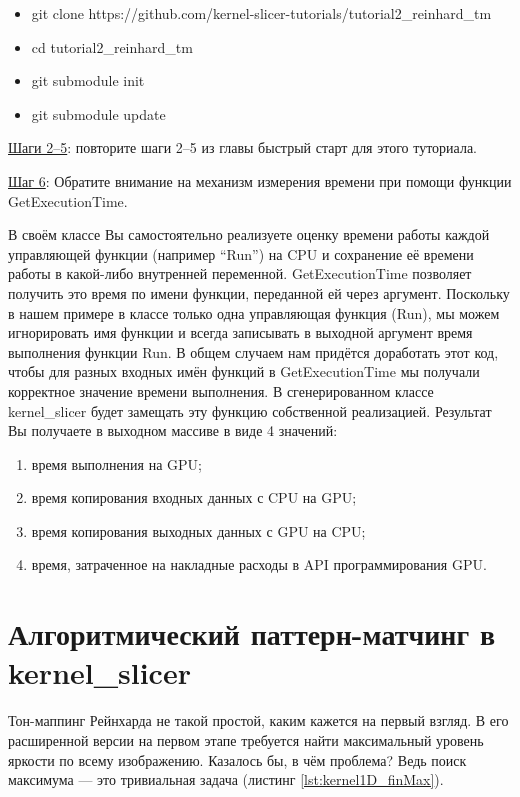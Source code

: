 \documentclass[11pt,fleqn,english,russian]{report} %
\begin{document}
\begin{itemize}
	\item git clone https://github.com/kernel-slicer-tutorials/tutorial2\_reinhard\_tm
	\item cd tutorial2\_reinhard\_tm
	\item git submodule init
	\item git submodule update
\end{itemize}

\vspace*{5px}
\noindent\underline{Шаги 2--5}: повторите шаги 2--5 из главы быстрый старт для этого туториала. 

\vspace*{5px}
\noindent\underline{Шаг 6}: Обратите внимание на механизм измерения времени при помощи функции GetExecutionTime. 

В своём классе Вы самостоятельно реализуете оценку времени работы каждой управляющей функции (например ``Run'') на CPU и сохранение её времени работы в какой-либо внутренней переменной. GetExecutionTime позволяет получить это время по имени функции, переданной ей через аргумент. Поскольку в нашем примере в классе только одна управляющая функция (Run), мы можем игнорировать имя функции и всегда записывать в выходной аргумент время выполнения функции Run. В общем случаем нам придётся доработать этот код, чтобы для разных входных имён функций в GetExecutionTime мы получали корректное значение времени выполнения. В сгенерированном классе kernel\_slicer будет замещать эту функцию собственной реализацией. Результат Вы получаете в выходном массиве в виде 4 значений: 

\begin{enumerate}
\item время выполнения на GPU;
\item время копирования входных данных с CPU на GPU;
\item время копирования выходных данных с GPU на CPU;
\item время, затраченное на накладные расходы в API программирования GPU.
\end{enumerate}

\section{Алгоритмический паттерн-матчинг в kernel\_slicer}

Тон-маппинг Рейнхарда не такой простой, каким кажется на первый взгляд. В его расширенной версии на первом этапе требуется найти максимальный уровень яркости по всему изображению. Казалось бы, в чём проблема? Ведь поиск максимума --- это тривиальная задача (листинг \ref{lst:kernel1D_finMax}).
\end{document}
